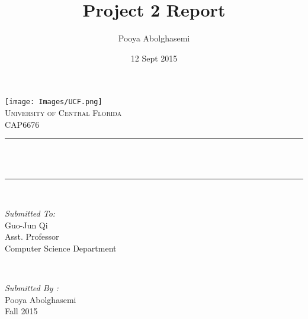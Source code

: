 \documentclass[12pt]{article}
\title{Project 2 Report}								%
\author{Pooya Abolghasemi}								%
\date{12 Sept 2015}											%
\makeatletter
\let\thetitle\@title
\makeatother
\begin{document}

\begin{titlepage}
	\centering
    \vspace*{0.5 cm}
    \texttt{[image: Images/UCF.png]}\\[1.0 cm]	%
    \textsc{\LARGE University of Central Florida}\\[2.0 cm]	%
	\textsc{\Large CAP6676}\\[0.5 cm]				%
	\rule{\linewidth}{0.2 mm} \\[0.4 cm]
	{ \huge \bfseries \thetitle}\\
	\rule{\linewidth}{0.2 mm} \\[1.5 cm]

	\begin{minipage}{0.4\textwidth}
		\begin{flushleft} \large
			\emph{Submitted To:}\\
			Guo-Jun Qi\\
            Asst. Professor\\
            Computer Science Department\\
			\end{flushleft}
			\end{minipage}~
			\begin{minipage}{0.4\textwidth}

			\begin{flushright} \large
			\emph{Submitted By :} \\
			Pooya Abolghasemi\\
            Fall 2015\\
		\end{flushright}

	\end{minipage}\\[2 cm]

\end{titlepage}


\tableofcontents
\pagebreak


\
\end{document}
